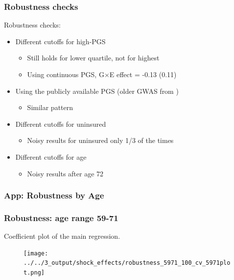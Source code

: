 \documentclass[10pt,compress,xcolor=dvipsnames]{beamer}    %
\newcounter{ex}
\newcommand{\1}[1]{\mathrm{1\hspace*{-2.5pt}l}[#1]}	%
\begin{document}
\begin{frame}
\frametitle{Robustness checks}
\label{frame:robustness}

Robustness checks:

\begin{itemize}
	\item Different cutoffs for high-PGS \hyperlink{fig:coeffplot25highPGS}{}
	\begin{itemize}
		\item Still holds for lower quartile, not for highest
		\item Using continuous PGS, G$\times$E effect = -0.13 (0.11)
	\end{itemize}

	\vspace{1ex}

	\item Using the publicly available PGS (older GWAS from \cite{TAG2010}) \hyperlink{fig:oldPGS}{}
	\begin{itemize}
		\item Similar pattern
	\end{itemize}

	\vspace{1ex}

	\item Different cutoffs for uninsured \hyperlink{fig:coeffplot66unins}{}
	\begin{itemize}
		\item Noisy results for uninsured only 1/3 of the times
	\end{itemize}

	\vspace{1ex}

	\item Different cutoffs for age \hyperlink{fig:coeffplot59-71}{}
	\begin{itemize}
		\item Noisy results after age 72
	\end{itemize}
\end{itemize}

\end{frame}


\subsubsection{App: Robustness by Age}
\begin{frame}
\frametitle{Robustness: age range 59-71}
Coefficient plot of the main regression.
\begin{figure}[hbtp]
\centering
\texttt{[image: ../../3\_output/shock\_effects/robustness\_5971\_100\_cv\_5971plot.png]}
\label{fig:coeffplot59-71}
\end{figure}
\hyperlink{frame:robustness}{}
\end{frame}
\end{document}
